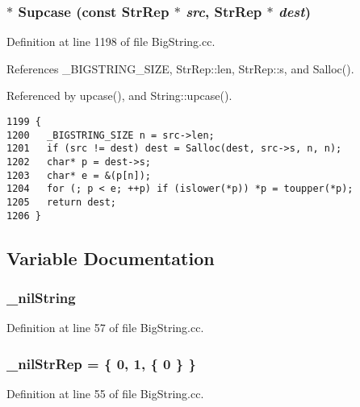\subsubsection{$\ast$ Supcase (const {\bf Str\-Rep} $\ast$ {\em src}, {\bf Str\-Rep} $\ast$ {\em dest})}\label{BigString_8cc_a35}




Definition at line 1198 of file Big\-String.cc.

References \_\-BIGSTRING\_\-SIZE, Str\-Rep::len, Str\-Rep::s, and Salloc().

Referenced by upcase(), and String::upcase().



\footnotesize\begin{verbatim}1199 {
1200   _BIGSTRING_SIZE n = src->len;
1201   if (src != dest) dest = Salloc(dest, src->s, n, n);
1202   char* p = dest->s;
1203   char* e = &(p[n]);
1204   for (; p < e; ++p) if (islower(*p)) *p = toupper(*p);
1205   return dest;
1206 }
\end{verbatim}\normalsize 


\subsection{Variable Documentation}
\subsubsection{ \_\-nil\-String}\label{BigString_8cc_a7}




Definition at line 57 of file Big\-String.cc.
\subsubsection{ \_\-nil\-Str\-Rep = \{ 0, 1, \{ 0 \} \}}\label{BigString_8cc_a6}




Definition at line 55 of file Big\-String.cc.